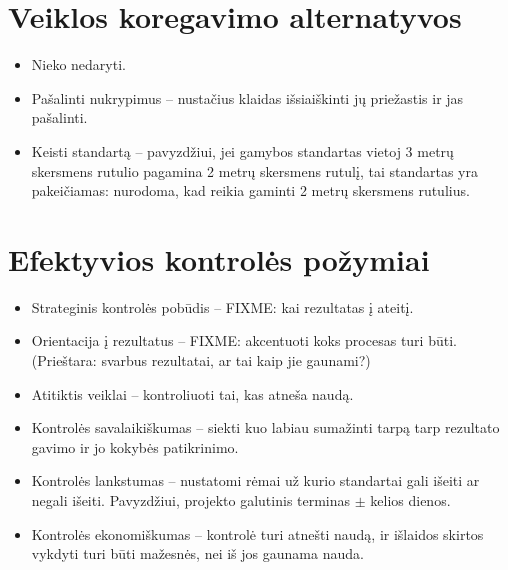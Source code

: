 \section{Veiklos koregavimo alternatyvos}

\begin{itemize}
  \item Nieko nedaryti.
  \item Pašalinti nukrypimus – nustačius klaidas išsiaiškinti jų priežastis
    ir jas pašalinti.
  \item Keisti standartą – pavyzdžiui, jei gamybos standartas vietoj
    3 metrų skersmens rutulio pagamina 2 metrų skersmens rutulį, tai
    standartas yra pakeičiamas: nurodoma, kad reikia gaminti 2 metrų
    skersmens rutulius.
\end{itemize}

\section{Efektyvios kontrolės požymiai}

\begin{itemize}
  \item Strateginis kontrolės pobūdis – FIXME: kai rezultatas į ateitį.
  \item Orientacija į rezultatus – FIXME: akcentuoti koks procesas turi
    būti. (Prieštara: svarbus rezultatai, ar tai kaip jie gaunami?)
  \item Atitiktis veiklai – kontroliuoti tai, kas atneša naudą.
  \item Kontrolės savalaikiškumas – siekti kuo labiau sumažinti tarpą
    tarp rezultato gavimo ir jo kokybės patikrinimo.
  \item Kontrolės lankstumas – nustatomi rėmai už kurio standartai
    gali išeiti ar negali išeiti. Pavyzdžiui, projekto galutinis terminas
    $\pm$ kelios dienos.
  \item Kontrolės ekonomiškumas – kontrolė turi atnešti naudą, ir išlaidos
    skirtos vykdyti turi būti mažesnės, nei iš jos gaunama nauda.
\end{itemize}
